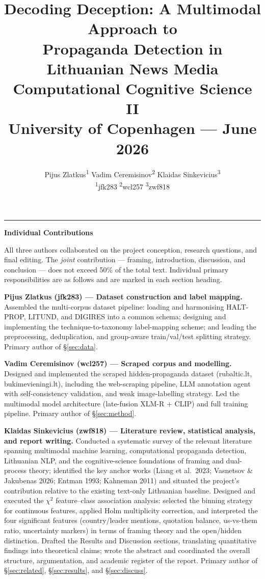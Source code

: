 \documentclass[12pt,a4paper]{article}
\title{\textbf{Decoding Deception: A Multimodal Approach to\\
Propaganda Detection in Lithuanian News Media}\\[0.5em]
\large Computational Cognitive Science II\\
University of Copenhagen --- June 2026}
\author{
  Pijus Zlatkus\textsuperscript{1}\quad
  Vadim Ceremisinov\textsuperscript{2}\quad
  Klaidas Sinkevicius\textsuperscript{3}\\[0.4em]
  \small
  \textsuperscript{1}jfk283 \quad
  \textsuperscript{2}wcl257 \quad
  \textsuperscript{3}zwf818
}
\date{}
\begin{document}
\maketitle
\thispagestyle{empty}

\vspace{1em}
\noindent\rule{\linewidth}{0.4pt}
\begin{center}
  \textbf{Individual Contributions}
\end{center}
\noindent
All three authors collaborated on the project conception, research questions,
and final editing.
The \emph{joint} contribution --- framing, introduction, discussion, and
conclusion --- does not exceed 50\% of the total text.
Individual primary responsibilities are as follows and are marked in each
section heading.

\medskip
\noindent\textbf{Pijus Zlatkus (jfk283) --- Dataset construction and label mapping.}
Assembled the multi-corpus dataset pipeline: loading and harmonising HALT-PROP,
LITUND, and DIGIRES into a common schema; designing and implementing the
technique-to-taxonomy label-mapping scheme; and leading the preprocessing,
deduplication, and group-aware train/val/test splitting strategy.
Primary author of \S\ref{sec:data}.

\medskip
\noindent\textbf{Vadim Ceremisinov (wcl257) --- Scraped corpus and modelling.}
Designed and implemented the scraped hidden-propaganda dataset
(rubaltic.lt, bukimevieningi.lt), including the web-scraping pipeline,
LLM annotation agent with self-consistency validation, and weak image-labelling
strategy.
Led the multimodal model architecture (late-fusion XLM-R + CLIP) and full
training pipeline.
Primary author of \S\ref{sec:method}.

\medskip
\noindent\textbf{Klaidas Sinkevicius (zwf818) --- Literature review, statistical analysis, and report writing.}
Conducted a systematic survey of the relevant literature spanning multimodal
machine learning, computational propaganda detection, Lithuanian NLP, and the
cognitive-science foundations of framing and dual-process theory;
identified the key anchor works (Liang et al.\ 2023; Vasnetsov \& Jakubenas
2026; Entman 1993; Kahneman 2011) and situated the project's contribution
relative to the existing text-only Lithuanian baseline.
Designed and executed the $\chi^2$ feature--class association analysis:
selected the binning strategy for continuous features, applied Holm
multiplicity correction, and interpreted the four significant features
(country/leader mentions, quotation balance, us-vs-them ratio, uncertainty
markers) in terms of framing theory and the open/hidden distinction.
Drafted the Results and Discussion sections, translating quantitative findings
into theoretical claims; wrote the abstract and coordinated the overall
structure, argumentation, and academic register of the report.
Primary author of \S\ref{sec:related}, \S\ref{sec:results}, and \S\ref{sec:discuss}.
\end{document}
